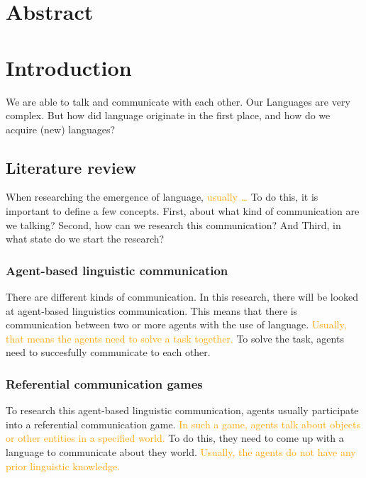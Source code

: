 \documentclass[a4paper, 12pt]{report}
\begin{document}
\setcounter{page}{1}
\pagestyle{plain} 

\chapter*{Abstract}

\tableofcontents


\chapter{Introduction}

We are able to talk and communicate with each other. 
Our Languages are very complex. 
But how did language originate in the first place, and how do we acquire (new) languages? 

\section{Literature review}

When researching the emergence of language, \textcolor{orange}{usually \dots}
To do this, it is important to define a few concepts. 
First, about what kind of communication are we talking?
Second, how can we research this communication? 
And Third, in what state do we start the research?

\subsection{Agent-based linguistic communication}
There are different kinds of communication. 
In this research, there will be looked at agent-based linguistics communication. 
This means that there is communication between two or more agents with the use of language. 
\textcolor{orange}{Usually, that means the agents need to solve a task together.} 
To solve the task, agents need to succesfully communicate to each other. 

\subsection{Referential communication games}
To research this agent-based linguistic communication, agents usually participate into a referential communication game. 
\textcolor{orange}{In such a game, agents talk about objects or other entities in a specified world.}
To do this, they need to come up with a language to communicate about they world. 
\textcolor{orange}{Usually, the agents do not have any prior linguistic knowledge.} 
\end{document}
